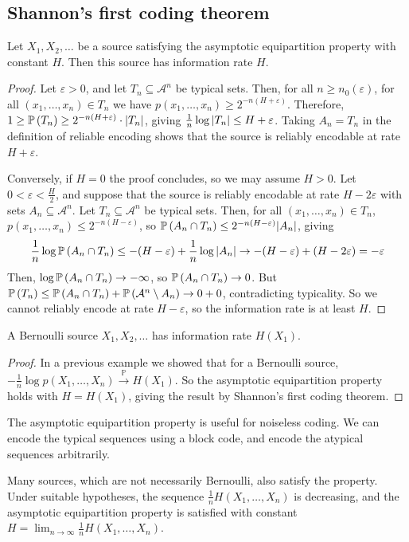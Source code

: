 \subsection{Shannon's first coding theorem}
\begin{theorem}
    Let \( X_1, X_2, \dots \) be a source satisfying the asymptotic equipartition property with constant \( H \).
    Then this source has information rate \( H \).
\end{theorem}
\begin{proof}
    Let \( \varepsilon > 0 \), and let \( T_n \subseteq \mathcal A^n \) be typical sets.
    Then, for all \( n \geq n_0(\varepsilon) \), for all \( (x_1, \dots, x_n) \in T_n \) we have \( p(x_1, \dots, x_n) \geq 2^{-n(H + \varepsilon)} \).
    Therefore, \( 1 \geq \mathbb{P}\left({T_n}\right) \geq 2^{-n(H + \varepsilon)} \cdot \abs{T_n} \), giving \( \frac{1}{n} \log \abs{T_n} \leq H + \varepsilon \).
    Taking \( A_n = T_n \) in the definition of reliable encoding shows that the source is reliably encodable at rate \( H + \varepsilon \).

    Conversely, if \( H = 0 \) the proof concludes, so we may assume \( H > 0 \).
    Let \( 0 < \varepsilon < \frac{H}{2} \), and suppose that the source is reliably encodable at rate \( H - 2\varepsilon \) with sets \( A_n \subseteq \mathcal A^n \).
    Let \( T_n \subseteq \mathcal A^n \) be typical sets.
    Then, for all \( (x_1, \dots, x_n) \in T_n \), \( p(x_1, \dots, x_n) \leq 2^{-n(H - \varepsilon)} \), so \( \mathbb{P}\left({A_n \cap T_n}\right) \leq 2^{-n(H - \varepsilon)} \abs{A_n} \), giving
    \[ \frac{1}{n} \log \mathbb{P}\left({A_n \cap T_n}\right) \leq -(H - \varepsilon) + \frac{1}{n} \log \abs{A_n} \to -(H - \varepsilon) + (H - 2 \varepsilon) = -\varepsilon \]
    Then, \( \log \mathbb{P}\left({A_n \cap T_n}\right) \to -\infty \), so \( \mathbb{P}\left({A_n \cap T_n}\right) \to 0 \).
    But \( \mathbb{P}\left({T_n}\right) \leq \mathbb{P}\left({A_n \cap T_n}\right) + \mathbb{P}\left({\mathcal A^n \setminus A_n}\right) \to 0 + 0 \), contradicting typicality.
    So we cannot reliably encode at rate \( H - \varepsilon \), so the information rate is at least \( H \).
\end{proof}
\begin{corollary}
    A Bernoulli source \( X_1, X_2, \dots \) has information rate \( H(X_1) \).
\end{corollary}
\begin{proof}
    In a previous example we showed that for a Bernoulli source, \( -\frac{1}{n} \log p(X_1, \dots, X_n) \xrightarrow{\mathbb P} H(X_1) \).
    So the asymptotic equipartition property holds with \( H = H(X_1) \), giving the result by Shannon's first coding theorem.
\end{proof}
\begin{remark}
    The asymptotic equipartition property is useful for noiseless coding.
    We can encode the typical sequences using a block code, and encode the atypical sequences arbitrarily.

    Many sources, which are not necessarily Bernoulli, also satisfy the property.
    Under suitable hypotheses, the sequence \( \frac{1}{n} H(X_1, \dots, X_n) \) is decreasing, and the asymptotic equipartition property is satisfied with constant \( H = \lim_{n \to \infty} \frac{1}{n} H(X_1, \dots, X_n) \).
\end{remark}

